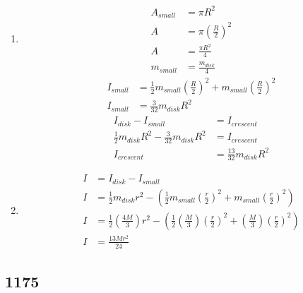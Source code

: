 \documentclass{article}
\begin{document}
\begin{enumerate}[label = \boldalpha]
	\item
		\begin{align*}
			A_{small} & = \pi R^2 \\
			A & = \pi \left( \frac{R}{2} \right)^2 \\
			A & = \frac{ \pi R^2 }{ 4 } \\
			m_{small} & = \frac{m_{disk}}{4}
		\end{align*}
		\begin{align*}
			I_{small} & = \frac{1}{2}m_{small}\left(\frac{R}{2}\right)^2 + m_{small}\left(\frac{R}{2}\right)^2 \\
			I_{small} & = \frac{3}{32}m_{disk}R^2
		\end{align*}
		\begin{align*}
			I_{disk} - I_{small} & = I_{crescent} \\
			\frac{1}{2}m_{disk}R^2 - \frac{3}{32}m_{disk}R^2 & = I_{crescent} \\
			I_{crescent} & = \frac{13}{32}m_{disk}R^2
		\end{align*}
	\item
		\begin{align*}
			I & = I_{disk} - I_{small} \\
			I & = \frac{1}{2}m_{disk}r^2 - \left( \frac{1}{2}m_{small} \left( \frac{r}{2} \right)^2 + m_{small} \left( \frac{r}{2} \right)^2 \right) \\
			I & = \frac{1}{2}\left( \frac{4M}{3} \right)r^2 - \left( \frac{1}{2}\left( \frac{M}{3} \right) \left( \frac{r}{2} \right)^2 + \left( \frac{M}{3} \right) \left( \frac{r}{2} \right)^2 \right) \\
			I & = \frac{13Mr^2}{24}
		\end{align*}
\end{enumerate}

\subsection{1175}
\end{document}
